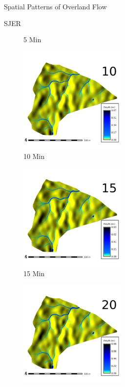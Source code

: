 \documentclass[
  ignorenonframetext,
]{beamer}
\begin{document}
\begin{frame}{Spatial Patterns of Overland Flow}
\begin{block}{SJER}
\begin{figure}[H]
{}

\caption{5 Min}

\end{figure}%

\begin{figure}[H]

{\centering \includegraphics[width=2.08333in,height=\textheight]{../output/SJER/sensitivity_1/SJER_depth_1_4_s_10_average.png}

}

\caption{10 Min}

\end{figure}%

\begin{figure}[H]

{\centering \includegraphics[width=2.08333in,height=\textheight]{../output/SJER/sensitivity_1/SJER_depth_1_4_s_15_average.png}

}

\caption{15 Min}

\end{figure}%

\begin{figure}[H]

{\centering \includegraphics[width=2.08333in,height=\textheight]{../output/SJER/sensitivity_1/SJER_depth_1_4_s_20_average.png}

}
\end{figure}
\end{block}
\end{frame}
\end{document}
